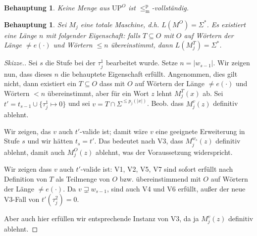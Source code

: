 \documentclass[nofonts]{uebung}
\newtheorem{claim}[theorem]{Behauptung}
\def\UP{\ensuremath{\mathrm{UP}}}
\def\leqmp{\ensuremath{\leq_\mathrm{m}^\mathrm{p}}}
\begin{document}
\begin{claim}
    Keine Menge aus $\UP^O$ ist $\leqmp$-vollständig.
\end{claim}


\begin{claim}
    Sei $M_j$ eine totale Maschine, d.h. $L(M^O)=\Sigma^*$.
    Es existiert eine Länge $n$ mit folgender Eigenschaft: 
    falls $T\subseteq O$ mit $O$ auf Wörtern der Länge $\neq e(\cdot)$ und Wörtern $\leq n$ übereinstimmt, dann $L(M_j^T)=\Sigma^*$.
\end{claim}
\begin{proof}[Skizze.]
    Sei $s$ die Stufe bei der $\tau^1_j$ bearbeitet wurde. Setze $n=|w_{s-1}|$.
    Wir zeigen nun, dass dieses $n$ die behauptete Eigenschaft erfüllt.
    Angenommen, dies gilt nicht, dann existiert ein $T\subseteq O$ dass mit $O$ auf Wörtern der Länge $\neq e(\cdot)$ und Wörtern $<n$ übereinstimmt, aber für ein Wort $z$ lehnt $M_j^T(x)$ ab.
    Sei $t'=t_{s-1}\cup \{\tau^1_j\mapsto 0\}$ und sei $v=T\cap\Sigma^{\leq p_j(|x|)}$. 
    Beob. dass $M_j^v(z)$ definitiv ablehnt.

    Wir zeigen, das $v$ auch $t'$-valide ist;  damit wäre $v$ eine geeignete Erweiterung in Stufe $s$ und wir hätten $t_s=t'$. 
    Das bedeutet nach V3, dass $M_j^{w_s}(z)$ definitiv ablehnt, damit auch $M_j^O(z)$ ablehnt, was der Voraussetzung widerspricht.

    Wir zeigen dass $v$ auch $t'$-valide ist:
    V1, V2, V5, V7 sind sofort erfüllt nach Definition von $T$ als Teilmenge von $O$ bzw. übereinstimmend mit $O$ auf Wörtern der Länge $\neq e(\cdot)$.
    Da $v\sqsupsetneq w_{s-1}$, sind auch V4 und V6 erfüllt, außer der neue V3-Fall von $t'(\tau_j^2)=0$.

    Aber auch hier erfüllen wir entsprechende Instanz von V3, da ja $M_j^v(z)$ definitiv ablehnt.
\end{proof}
\end{document}
